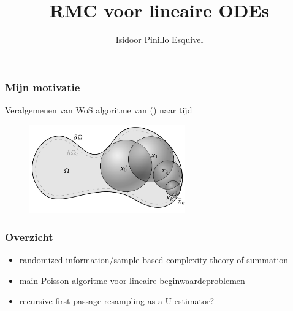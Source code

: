 \documentclass[18pt,aspectratio=149]{beamer}
\title{RMC voor lineaire ODEs}
\author{Isidoor Pinillo Esquivel }
\date{}
\begin{document}
\begin{frame}
    \titlepage
\end{frame}
\begin{frame}
    \frametitle{Mijn motivatie}
    Veralgemenen van WoS algoritme van (\cite{sawhney_grid-free_2022})
    naar tijd
    \vspace{-0.25cm}
    \begin{figure}[h!]
        \centering
        \includegraphics[width=0.6\textwidth]{imgs/Walk_on_Spheres_illustration.jpg}
        \label{fig:Walk_on_Spheres_illustration.jpg}
    \end{figure}
\end{frame}

\begin{frame}
    \frametitle{Overzicht}
    \begin{itemize}
        \item randomized information/sample-based complexity theory of summation
        \item main Poisson algoritme voor lineaire beginwaardeproblemen
        \item recursive first passage resampling as a U-estimator?
    \end{itemize}
\end{frame}
\end{document}
